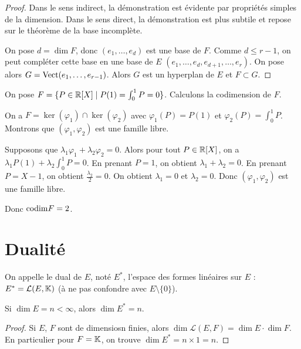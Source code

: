 \documentclass[11pt,a4paper]{report}
\begin{document}
\begin{proof}
    Dans le sens indirect, la démonstration est évidente par propriétés simples de la dimension. Dans le sens direct, la démonstration est plus subtile et repose sur le théorème de la base incomplète.

    On pose $d = \dim F$, donc $(e_1, \dots, e_d)$ est une base de $F$. Comme $d \le r-1$, on peut compléter cette base en une base de $E$ $(e_1, \dots, e_d, e_{d+1}, \dots, e_r)$. On pose alors $G = \mathrm{Vect}(e_1, \dots, e_{r-1})$. Alors $G$ est un hyperplan de $E$ et $F \subset G$.
\end{proof}

\begin{example}
    On pose $F = \{P \in \mathbb{R}[X] \mid P(1) = \int_0^1 P = 0\}$.
    Calculons la codimension de $F$.

    On a $F = \ker(\varphi_1) \cap \ker(\varphi_2)$ avec $\varphi_1(P) = P(1)$ et $\varphi_2(P) = \int_0^1 P$. Montrons que $(\varphi_1, \varphi_2)$ est une famille libre.

    Supposons que $\lambda_1 \varphi_1 + \lambda_2 \varphi_2 = 0$. Alors pour tout $P \in \mathbb{R}[X]$, on a $\lambda_1 P(1) + \lambda_2 \int_0^1 P = 0$. En prenant $P = 1$, on obtient $\lambda_1 + \lambda_2 = 0$. En prenant $P = X-1$, on obtient $\frac{\lambda_2}{2} = 0$. On obtient $\lambda_1 = 0$ et $\lambda_2 = 0$. Donc $(\varphi_1, \varphi_2)$ est une famille libre.

    Donc $\mathrm{codim} F = 2$.
\end{example}

\chapter{Dualité}

\begin{definition}[Dual]
    On appelle le dual de $E$, noté $E^*$, l'espace des formes linéaires sur $E$ : $E^* = \mathcal L(E, \mathbb{K})$ (à ne pas confondre avec $E\setminus \{0\}$).
\end{definition}

\begin{proposition}
    Si $\dim E = n < \infty$, alors $\dim E^* = n$.
\end{proposition}

\begin{proof}
    Si $E$, $F$ sont de dimensiosn finies, alors $\dim \mathcal L(E,F) = \dim E \cdot \dim F$. En particulier pour $F = \mathbb{K}$, on trouve $\dim E^* = n \times 1 = n$.
\end{proof}
\end{document}
